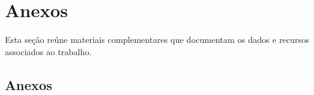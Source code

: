 \documentclass[12pt]{article} %
\begin{document}
	
	\chapter{Anexos} %

		Esta seção reúne materiais complementares que documentam os dados e recursos associados ao trabalho.
	
	\section*{Anexos}

		
%		
%		
%		
%		
%		
%		
%		
		
		
	
\end{document}
